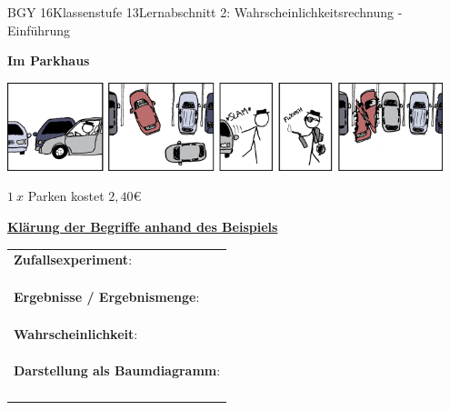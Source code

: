 \documentclass[oneside,openany,headings=optiontotoc,11pt,numbers=noenddot]{scrreprt}
\begin{document}
	\begin{worksheet}{BGY 16}{Klassenstufe 13}{Lernabschnitt 2: Wahrscheinlichkeitsrechnung - Einführung}
				
		\noindent
		\sffamily
		\begin{framed}
			\noindent
			\begin{minipage}{0.35\textwidth}
				\Huge{\textbf{Im Parkhaus}}\\
			\end{minipage}
			\hfill
			\begin{minipage}{0.68\textwidth}
				\includegraphics[width=0.95\textwidth]{../99_Bilder/04_WKR/parking.png}\\
				\tiny{\color{codegray}{Quelle: https://xkcd.com/562/}}
			\end{minipage}
			\normalsize
			\par\noindent
			\Large{\(1\ x\) Parken kostet \(2,40\)\euro}\\
			\par\noindent
		\end{framed}
		\begin{framed}
			\noindent
			\Large\textbf{\underline{Klärung der Begriffe anhand des Beispiels}}\\
			\normalsize
			\par\noindent
			\begin{tabularx}{\textwidth}{X}
				\textbf{Zufallsexperiment}:\\
				\\
				\\
				\\
				\textbf{Ergebnisse / Ergebnismenge}:\\
				\\
				\\
				\\
				\textbf{Wahrscheinlichkeit}:\\
				\\
				\\
				\\
				\textbf{Darstellung als Baumdiagramm}:\\
				\\
				\\
				\\
				\\

\end{tabularx}
\end{framed}
\end{worksheet}
\end{document}
